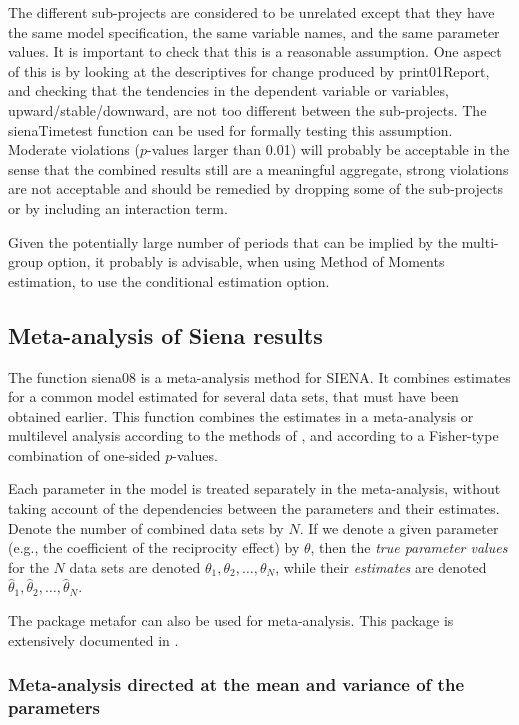 \documentclass[a4paper,fleqn,11pt]{article}
\newcommand{\+}{\, + \,}
\newcommand{\sfn}[1]{\textsf{#1}}
\newcommand{\si}{{\sf SIENA}}
\begin{document}
The different sub-projects are considered to be unrelated
except that they have the same model specification,
the same variable names, and the same parameter values.
It is important to check that this is a reasonable assumption.
One aspect of this is by looking at the descriptives for change
produced by \textsf{print01Report}, and checking that the
tendencies in the dependent variable or variables, upward/stable/downward,
are not too different between the sub-projects.
The \textsf{sienaTimetest} function can be used for
formally testing this assumption.
Moderate violations ($p$-values larger than 0.01) will probably
be acceptable in the sense that the combined results
still are a meaningful aggregate, strong violations are not acceptable
and should be remedied by dropping some of the sub-projects or by
including an interaction term.

Given the potentially large number of periods that can be implied
by the multi-group option, it probably is advisable,
when using Method of Moments estimation, to use
the conditional estimation option.



\subsection{Meta-analysis of Siena results}
\label{S_Siena08}

The function \textsf{siena08} is a meta-analysis method for \si.
It combines estimates for a common model
   estimated for several data sets,
   that must have been obtained earlier.
   This function combines
   the estimates in a meta-analysis or multilevel analysis
   according to the methods of \citet{SnijdersBaerveldt03},
   and according to a Fisher-type combination of one-sided $p$-values.

Each parameter in the model is treated separately
in the meta-analysis, without taking account of the
dependencies between the parameters and their estimates.
Denote the number of combined data sets by $N$.
If we denote a given parameter (e.g., the
coefficient of the reciprocity effect) by $\theta$,
then the \emph{true parameter values} for the
$N$ data sets are denoted $\theta_1, \theta_2, \ldots, \theta_N$,
while their \emph{estimates} are denoted
 $\hat\theta_1, \hat\theta_2, \ldots, \hat\theta_N$.

The package \sfn{metafor} can also be used for meta-analysis.
This package is extensively documented in \citet{Viechtbauer2010}.

\subsubsection{Meta-analysis directed at the mean
               and variance of the parameters}
\end{document}
